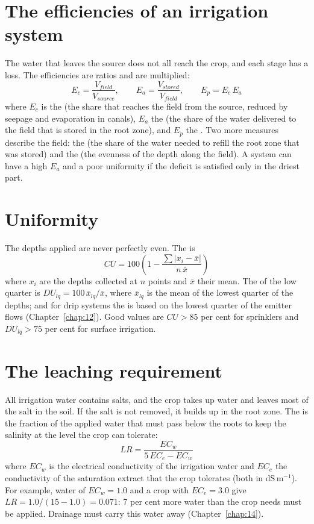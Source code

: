 \section{The efficiencies of an irrigation system}
The water that leaves the source does not all reach the crop, and each stage has a loss. The efficiencies are ratios and are multiplied:
\begin{equation*}\boxed{E_c=\frac{V_{field}}{V_{source}},\qquad E_a=\frac{V_{stored}}{V_{field}},\qquad E_{p}=E_c\,E_a}\end{equation*}
where $E_c$ is the  (the share that reaches the field from the source, reduced by seepage and evaporation in canals), $E_a$ the  (the share of the water delivered to the field that is stored in the root zone), and $E_p$ the . Two more measures describe the field: the  (the share of the water needed to refill the root zone that was stored) and the  (the evenness of the depth along the field). A system can have a high $E_a$ and a poor uniformity if the deficit is satisfied only in the driest part.

\section{Uniformity}
The depths applied are never perfectly even. The  is
\begin{equation*}\boxed{CU=100\left(1-\frac{\sum|x_i-\bar x|}{n\,\bar x}\right)}\end{equation*}
where $x_i$ are the depths collected at $n$ points and $\bar x$ their mean. The  of the low quarter is $DU_{lq}=100\,\bar x_{lq}/\bar x$, where $\bar x_{lq}$ is the mean of the lowest quarter of the depths; and for drip systems the  is based on the lowest quarter of the emitter flows (Chapter~\ref{chap:12}). Good values are $CU>85$ per cent for sprinklers and $DU_{lq}>75$ per cent for surface irrigation.

\section{The leaching requirement}
All irrigation water contains salts, and the crop takes up water and leaves most of the salt in the soil. If the salt is not removed, it builds up in the root zone. The  is the fraction of the applied water that must pass below the roots to keep the salinity at the level the crop can tolerate:
\begin{equation*}\boxed{LR=\frac{EC_w}{5\,EC_e-EC_w}}\end{equation*}
where $EC_w$ is the electrical conductivity of the irrigation water and $EC_e$ the conductivity of the saturation extract that the crop tolerates (both in dS\,m$^{-1}$). For example, water of $EC_w=1.0$ and a crop with $EC_e=3.0$ give $LR=1.0/(15-1.0)=0.071$: 7 per cent more water than the crop needs must be applied. Drainage must carry this water away (Chapter~\ref{chap:14}).

